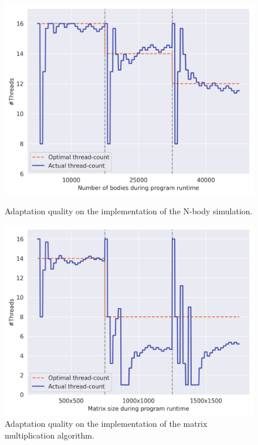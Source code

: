 \begin{figure}[t]
    \centering
    \begin{minipage}[c]{0.49\linewidth}
        \centering
        \captionsetup{width=0.9\linewidth}
        \includegraphics[width=\linewidth]{images/adapt_nbody.png}
        \caption{Adaptation quality on the \sac{} implementation of the N-body simulation.}
        \label{fig:adapt-nbody}
    \end{minipage}%
    \begin{minipage}[c]{0.49\linewidth}
        \centering
        \captionsetup{width=0.9\linewidth}
        \includegraphics[width=\linewidth]{images/adapt_matmul.png}
        \caption{Adaptation quality on the \sac{} implementation of the matrix multiplication
        algorithm.}
        \label{fig:adapt-matmul}
    \end{minipage}%
\end{figure}

